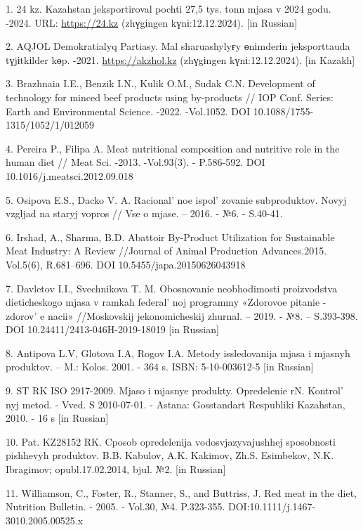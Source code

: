 \begin{references}
1. 24 kz. Kazahstan jeksportiroval pochti 27,5 tys. tonn mjasa v 2024
godu. -2024. URL:
\href{https://24.kz/ru/news/economyc/item/664590-kazakhstan-eksportiroval-pochti-27-5-tys-tonn-myasa-v-2024-godu}{https://24.kz}
(zhүgіngen kүnі:12.12.2024). {[}in Russian{]}

2. AQJOL Demokratialyq Partiasy. Mal sharuashylyғy өnіmderіn
jeksporttauda tүjіtkіlder kөp.
-2021. \href{https://akzhol.kz/index.php/kk/initiated-bills/mal-sharwashylyghy-oenimderin-eksporttawda-tuejtkilder-koep}{https://akzhol.kz}
(zhүgіngen kүnі:12.12.2024). {[}in Kazakh{]}

3. Brazhnaia I.E., Benzik I.N., Kulik O.M., Sudak C.N. Development of
technology for minced beef products using by-products // IOP Conf.
Series: Earth and Environmental Science. -2022. -Vol.1052. DOI
10.1088/1755-1315/1052/1/012059

4. Pereira P., Filipa A. Meat nutritional composition and nutritive role
in the human diet // Meat Sci. -2013. -Vol.93(3). - P.586-592. DOI
10.1016/j.meatsci.2012.09.018

5. Osipova E.S., Dacko V. A. Racional' noe
ispol' zovanie subproduktov. Novyj vzgljad na staryj
vopros // Vse o mjase. -- 2016. - №6. - S.40-41.

6. Irshad, A., Sharma, B.D. Abattoir By-Product Utilization for
Sustainable Meat Industry: A Review //Journal of Animal Production
Advances.2015. Vol.5(6), R.681--696. DOI 10.5455/japa.20150626043918

7. Davletov I.I., Svechnikova T. M. Obosnovanie neobhodimosti
proizvodstva dieticheskogo mjasa v ramkah federal' noj
programmy «Zdorovoe pitanie - zdorov' e nacii»
//Moskovskij jekonomicheskij zhurnal. -- 2019. - №8. -- S.393-398. DOI
10.24411/2413-046H-2019-18019 {[}in Russian{]}

8. Antipova L.V, Glotova I.A, Rogov I.A. Metody issledovanija mjasa i
mjasnyh produktov. -- M.: Kolos. 2001. - 364 s. ISBN: 5-10-003612-5
{[}in Russian{]}

9. ST RK ISO 2917-2009. Mjaso i mjasnye produkty. Opredelenie rN.
Kontrol' nyj metod. - Vved. S 2010-07-01. - Astana:
Gosstandart Respubliki Kazahstan, 2010. - 16 s {[}in Russian{]}

10. Pat. KZ28152 RK. Cposob opredelenija vodosvjazyvajushhej sposobnosti
pishhevyh produktov. B.B. Kabulov, A.K. Kakimov, Zh.S. Esimbekov, N.K.
Ibragimov; opubl.17.02.2014, bjul. №2. {[}in Russian{]}

11. Williamson, C., Foster, R., Stanner, S., and Buttriss, J. Red meat
in the diet, Nutrition Bulletin. - 2005. - Vol.30, №4. P.323-355.
DOI:10.1111/j.1467-3010.2005.00525.x


\end{references}
